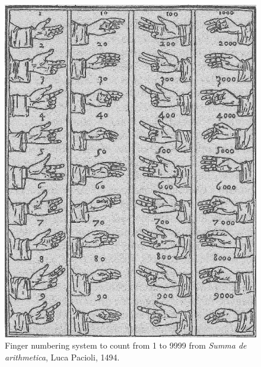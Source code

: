 \begin{figure}[h!t]
    \centering
    \includegraphics[scale=1]{assets/images/western_pacioli.jpg}
    \caption{Finger numbering system to count from 1 to 9999 from \emph{Summa de arithmetica}, Luca Pacioli, 1494.}
    \label{fig:western-pacioli}
\end{figure}

